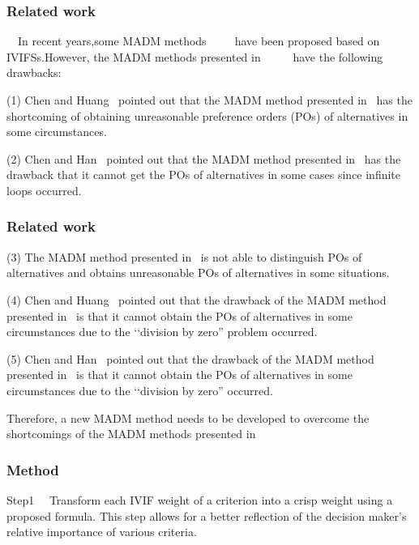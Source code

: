 \documentclass{beamer}
\begin{document}
\begin{frame}[fragile]
	\frametitle{Related work}
	\begin{block}{}
	\ \ In recent years,some MADM methods~\cite{chen2015}~\cite{chen2017}~\cite{chen2021}~\cite{chen2010}~\cite{Zhao2011}have been proposed based on IVIFSs.However, the MADM methods presented in~\cite{chen2015}~\cite{chen2017}~\cite{chen2021}~\cite{chen2010}~\cite{Zhao2011} have the following drawbacks:

 
    (1) Chen and Huang~\cite{chen2017_2} pointed out that the MADM method presented in~\cite{chen2015} has the shortcoming of obtaining unreasonable preference orders (POs) of alternatives in some circumstances.
    
    (2) Chen and Han~\cite{chen2018} pointed out that the MADM method presented in~\cite{chen2017} has the drawback that it cannot get the POs of alternatives in some cases since infinite loops occurred.
	\end{block}
\end{frame}
\begin{frame}[fragile]
	\frametitle{Related work}
	\begin{block}{}
    
    (3) The MADM method presented in~\cite{chen2021} is not able to distinguish POs of alternatives and obtains unreasonable POs of alternatives in some situations.
    
    (4) Chen and Huang~\cite{chen2017_2} pointed out that the drawback of the MADM method presented in~\cite{chen2010} is that it cannot obtain the POs of alternatives in some circumstances due to the ‘‘division by zero” problem occurred.
    
    (5) Chen and Han~\cite{chen2018} pointed out that the drawback of the MADM method presented in~\cite{Zhao2011} is that it cannot obtain the POs of alternatives in some circumstances due to the ‘‘division by zero” occurred.

Therefore, a new MADM method needs to be developed to overcome the shortcomings of the MADM methods presented in~\cite{chen2015}~\cite{chen2017}~\cite{chen2021}~\cite{chen2010}~\cite{Zhao2011}
	\end{block}
\end{frame}
\begin{frame}[fragile]
	\frametitle{Method}
        \begin{block}{Step1}
	\ \ Transform each IVIF weight of a criterion into a crisp weight using a proposed formula. This step allows for a better reflection of the decision maker's relative importance of various criteria.
        \end{block}
    
        
\end{frame}
\end{document}
